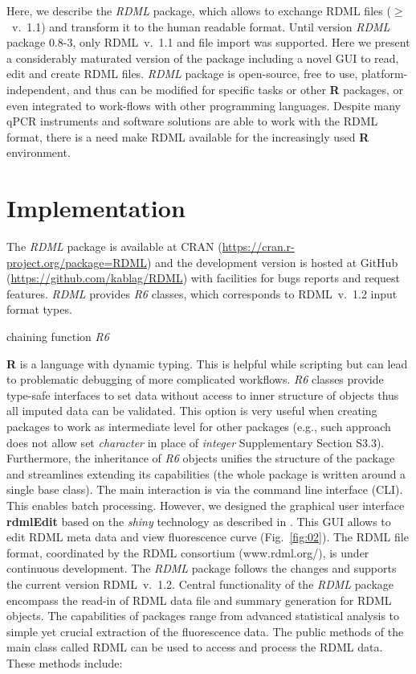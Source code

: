 \documentclass{bioinfo}
\begin{document}
Here, we describe the \textit{RDML} package, which 
allows to exchange RDML files ($\geq$~v.~1.1) and transform it to the human 
readable format. Until version \textit{RDML} package 0.8-3, only RDML~v.~1.1 and 
file import was supported. Here we present a considerably maturated version of 
the package including a novel GUI to read, edit and create RDML files. \textit{RDML} package is open-source, free to use, 
platform-independent, and thus can be modified for specific tasks or other 
\textbf{R} packages, or even integrated to work-flows with other programming 
languages. Despite many qPCR instruments and software solutions are able 
to work with the RDML format, there is a need make RDML available for the increasingly 
used \textbf{R} environment.

\section{Implementation}
	
The \textit{RDML} package is available at CRAN 
(\url{https://cran.r-project.org/package=RDML}) and the 
development version is hosted at GitHub (\url{https://github.com/kablag/RDML}) 
with facilities for bugs reports and request features. \textit{RDML} provides 
\emph{R6} classes, which corresponds to RDML~v.~1.2 input format types. 


chaining function \emph{R6}

\textbf{R} 
is a language with dynamic typing. This is helpful while scripting but can lead 
to problematic debugging of more complicated workflows. \emph{R6} classes 
provide type-safe interfaces to set data without access to inner structure of 
objects thus all imputed data can be validated. This option is very useful when 
creating packages to work as intermediate level for other packages (e.g., such 
approach does not allow set \emph{character} in place of \emph{integer} 
Supplementary Section S3.3). Furthermore, the inheritance of \emph{R6} objects 
unifies the structure of the package and streamlines extending its capabilities 
(the whole package is written around a single base class). The main interaction 
is via the command line interface (CLI). This enables batch processing. However, we designed the graphical user
interface \textbf{rdmlEdit} based on the \textit{shiny} technology as described in \cite{roediger2015chippcr}. This GUI allows to edit RDML meta data and view fluorescence
curve (Fig.~\ref{fig:02}). The RDML file format, coordinated by the RDML consortium (www.rdml.org/), is under continuous development. The \textit{RDML} 
package follows the changes and supports the current version RDML~v.~1.2. 
Central functionality of the \textit{RDML} package encompass the read-in of RDML 
data file and summary generation for RDML objects. The capabilities of packages 
range from advanced statistical analysis to simple yet crucial extraction of the 
fluorescence data. The public methods of the main class called RDML can be used 
to access and process the RDML data. These methods include:
\end{document}

